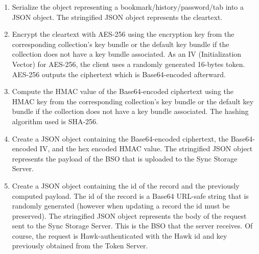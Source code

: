 \begin{enumerate}
  \item Serialize the object representing a bookmark/history/password/tab into a JSON object. The stringified JSON object represents the cleartext.

  \item Encrypt the cleartext with AES-256 using the encryption key from the corresponding collection's key bundle or the default key bundle if the collection does not have a key bundle associated. As an IV (Initialization Vector) for AES-256, the client uses a randomly generated 16-bytes token. AES-256 outputs the ciphertext which is Base64-encoded afterward.

  \item Compute the HMAC value of the Base64-encoded ciphertext using the HMAC key from the corresponding collection's key bundle or the default key bundle if the collection does not have a key bundle associated. The hashing algorithm used is SHA-256.

  \item Create a JSON object containing the Base64-encoded ciphertext, the Base64-encoded IV, and the hex encoded HMAC value. The stringified JSON object represents the payload of the BSO that is uploaded to the Sync Storage Server.

  \item Create a JSON object containing the id of the record and the previously computed payload. The id of the record is a Base64 URL-safe string that is randomly generated (however when updating a record the id must be preserved). The stringified JSON object represents the body of the request sent to the Sync Storage Server. This is the BSO that the server receives. Of course, the request is Hawk-authenticated with the Hawk id and key previously obtained from the Token Server.
\end{enumerate}
